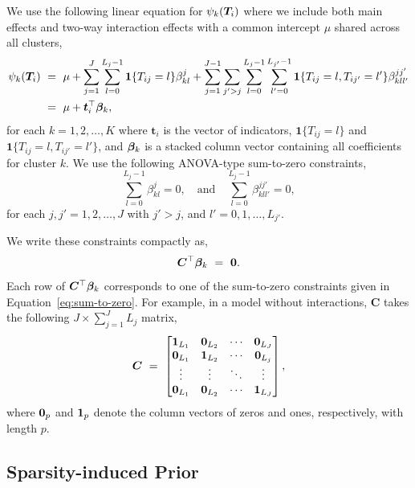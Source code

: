We use the following linear equation for $\psi_{k}(\bm{T}_i)$ where we
include both main effects and two-way interaction effects with a
common intercept $\mu$ shared across all clusters,
\begin{align*}
\psi_{k}(\bm{T}_i)& \ =\ \mu + \sum_{j=1}^J \sum_{l =0}^{L_j-1} 
\mathbf{1}\{T_{ij} = l\} \beta^j_{kl} + \sum_{j=1}^{J-1} \sum_{j' >
  j} \sum_{l=0}^{L_j-1} \sum_{l' = 0}^{L_{j'}-1} \mathbf{1}\{T_{ij} = l,
T_{ij'} = l'\} \beta^{jj'}_{kll'}\\
&\ =\ \mu + \bm{t}_i^\top\bm{\beta}_k, 
\end{align*}
for each $k=1,2,\ldots,K$ where $\bm{t}_i$ is the vector of
indicators, $\mathbf{1}\{T_{ij} = l\}$ and
$\mathbf{1}\{T_{ij} = l, T_{ij'} = l'\}$, and $\bm{\beta}_k$ is a stacked
column vector containing all coefficients for cluster $k$.  We use the
following ANOVA-type sum-to-zero constraints,
\begin{equation}
  \sum_{l =0}^{L_j-1} \beta^j_{kl} = 0, \quad \text{and} \quad
  \sum_{l=0}^{L_{j}-1} \beta^{jj'}_{kll'} = 0, \label{eq:sum-to-zero}
\end{equation}
for each $j,j'=1,2,\ldots,J$ with $j' > j$, and
$l'=0,1,\ldots,L_{j'}$. 

We write these constraints compactly as,
\begin{equation}
  \bm{C}^\top \bm{\beta}_k \ = \ \bm{0}. \label{eq:constraint}
\end{equation}
Each row of $\bm{C}^\top \bm{\beta}_k$
corresponds to one of the sum-to-zero constraints given in
Equation~\eqref{eq:sum-to-zero}.  For example, in a model without
interactions, $\bm{C}$ takes the following $J \times \sum_{j=1}^J L_j$
matrix,
\begin{equation*}
  \bm{C} \ = \ \begin{bmatrix} \bm{1}_{L_1} & \bm{0}_{L_2} & \cdots &
    \bm{0}_{L_J}
    \\ \bm{0}_{L_1} & \bm{1}_{L_2} & \cdots & \bm{0}_{L_j} \\
    \vdots & \vdots & \ddots & \vdots \\ \bm{0}_{L_1} &
    \bm{0}_{L_2}
    & \cdots &
    \bm{1}_{L_J}
  \end{bmatrix}, 
\end{equation*}
where $\bm{0}_p$ and $\bm{1}_p$ denote the column vectors of zeros and
ones, respectively, with length $p$.  

\subsection{Sparsity-induced Prior}

